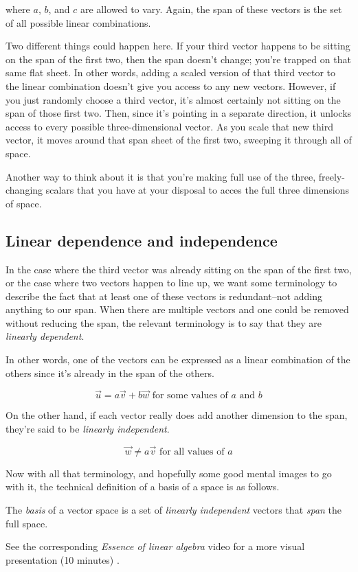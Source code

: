 where $a$, $b$, and $c$ are allowed to vary. Again, the span of these vectors is
the set of all possible linear combinations.

Two different things could happen here. If your third vector happens to be
sitting on the span of the first two, then the span doesn't change; you're
trapped on that same flat sheet. In other words, adding a scaled version of that
third vector to the linear combination doesn't give you access to any new
vectors. However, if you just randomly choose a third vector, it's almost
certainly not sitting on the span of those first two. Then, since it's pointing
in a separate direction, it unlocks access to every possible three-dimensional
vector. As you scale that new third vector, it moves around that span sheet of
the first two, sweeping it through all of space.

Another way to think about it is that you're making full use of the three,
freely-changing scalars that you have at your disposal to acces the full three
dimensions of space.

\subsection{Linear dependence and independence}

In the case where the third vector was already sitting on the span of the first
two, or the case where two vectors happen to line up, we want some terminology
to describe the fact that at least one of these vectors is redundant--not adding
anything to our span. When there are multiple vectors and one could be removed
without reducing the span, the relevant terminology is to say that they are
\textit{linearly dependent}.

In other words, one of the vectors can be expressed as a linear combination of
the others since it's already in the span of the others.

\begin{equation*}
  \vec{u} = a\vec{v} + b\vec{w} \text{ for some values of $a$ and $b$}
\end{equation*}

On the other hand, if each vector really does add another dimension to the span,
they're said to be \textit{linearly independent}.

\begin{equation*}
  \vec{w} \neq a\vec{v} \text{ for all values of $a$}
\end{equation*}

Now with all that terminology, and hopefully some good mental images to go with
it, the technical definition of a basis of a space is as follows.

\begin{definition}
  The \textit{basis} of a vector space is a set of \textit{linearly independent}
  vectors that \textit{span} the full space.
\end{definition}

\begin{remark}
  See the corresponding \textit{Essence of linear algebra} video for a more
  visual presentation (10 minutes) \cite{bib:linalg_linear_combinations}.
\end{remark}
